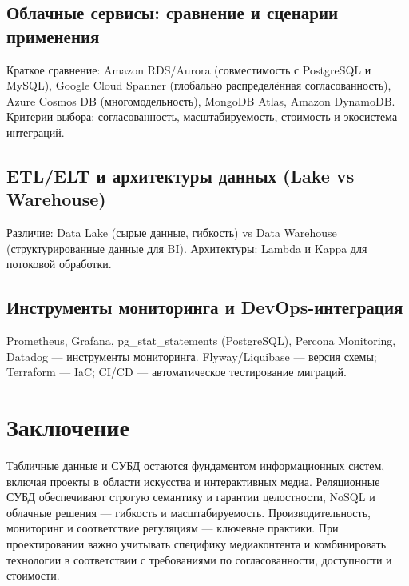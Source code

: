\documentclass[14pt,a4paper]{extarticle}
\begin{document}
\subsection{Облачные сервисы: сравнение и сценарии применения}
Краткое сравнение: Amazon RDS/Aurora (совместимость с PostgreSQL и MySQL), Google Cloud Spanner (глобально распределённая согласованность), Azure Cosmos DB (многомодельность), MongoDB Atlas, Amazon DynamoDB. Критерии выбора: согласованность, масштабируемость, стоимость и экосистема интеграций.

\subsection{ETL/ELT и архитектуры данных (Lake vs Warehouse)}
Различие: Data Lake (сырые данные, гибкость) vs Data Warehouse (структурированные данные для BI). Архитектуры: Lambda и Kappa для потоковой обработки.

\subsection{Инструменты мониторинга и DevOps-интеграция}
Prometheus, Grafana, pg\_stat\_statements (PostgreSQL), Percona Monitoring, Datadog — инструменты мониторинга. Flyway/Liquibase — версия схемы; Terraform — IaC; CI/CD — автоматическое тестирование миграций.

\section{Заключение}
Табличные данные и СУБД остаются фундаментом информационных систем, включая проекты в области искусства и интерактивных медиа. Реляционные СУБД обеспечивают строгую семантику и гарантии целостности, NoSQL и облачные решения — гибкость и масштабируемость. Производительность, мониторинг и соответствие регуляциям — ключевые практики. При проектировании важно учитывать специфику медиаконтента и комбинировать технологии в соответствии с требованиями по согласованности, доступности и стоимости.

\newpage
\printbibliography[title={Список использованных источников (по ГОСТ Р 7.0.99-2018)}]
\end{document}
